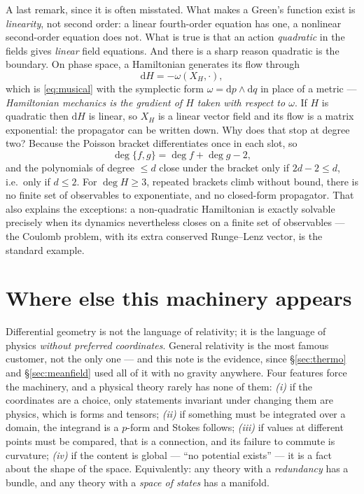 \documentclass[10pt,a4paper]{article}
\newcommand{\dd}{\mathrm{d}}
\theoremstyle{plain}
\theoremstyle{definition}
\numberwithin{equation}{section}
\begin{document}
A last remark, since it is often misstated. What makes a Green's function exist is
\emph{linearity}, not second order: a linear fourth-order equation has one, a nonlinear
second-order equation does not. What is true is that an action \emph{quadratic} in the fields
gives \emph{linear} field equations. And there is a sharp reason quadratic is the boundary. On
phase space, a Hamiltonian generates its flow through
\begin{equation}
\dd H=-\omega(X_H,\cdot),
\label{eq:hamvf}
\end{equation}
which is \eqref{eq:musical} with the symplectic form $\omega=\dd p\wedge\dd q$ in place of a
metric --- \emph{Hamiltonian mechanics is the gradient of $H$ taken with respect to $\omega$}.
If $H$ is quadratic then $\dd H$ is linear, so $X_H$ is a linear vector field and its flow is a
matrix exponential: the propagator can be written down. Why does that stop at degree two?
Because the Poisson bracket differentiates once in each slot, so
\begin{equation}
\deg\{f,g\}=\deg f+\deg g-2 ,
\label{eq:degcount}
\end{equation}
and the polynomials of degree $\le d$ close under the bracket only if $2d-2\le d$, i.e.\ only if
$d\le2$. For $\deg H\ge3$, repeated brackets climb without bound, there is no finite set of
observables to exponentiate, and no closed-form propagator. That also explains the exceptions: a
non-quadratic Hamiltonian is exactly solvable precisely when its dynamics nevertheless closes on
a finite set of observables --- the Coulomb problem, with its extra conserved Runge--Lenz
vector, is the standard example.

\section{Where else this machinery appears}
\label{sec:whygeom}

Differential geometry is not the language of relativity; it is the language of physics
\emph{without preferred coordinates}. General relativity is the most famous customer, not the
only one --- and this note is the evidence, since \S\ref{sec:thermo} and \S\ref{sec:meanfield}
used all of it with no gravity anywhere. Four features force the machinery, and a physical
theory rarely has none of them: \emph{(i)} if the coordinates are a choice, only statements
invariant under changing them are physics, which is forms and tensors; \emph{(ii)} if something
must be integrated over a domain, the integrand is a $p$-form and Stokes follows;
\emph{(iii)} if values at different points must be compared, that is a connection, and its
failure to commute is curvature; \emph{(iv)} if the content is global --- ``no potential exists''
--- it is a fact about the shape of the space. Equivalently: any theory with a \emph{redundancy}
has a bundle, and any theory with a \emph{space of states} has a manifold.
\end{document}
